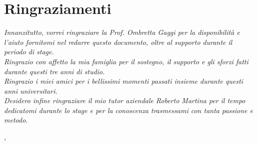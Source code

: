 \cleardoublepage
{}
{}

\bigskip

\begingroup
\let\clearpage\relax
\let\cleardoublepage\relax
\let\cleardoublepage\relax

\chapter*{Ringraziamenti}

\noindent \textit{Innanzitutto, vorrei ringraziare la Prof. Ombretta Gaggi per la disponibilità e l'aiuto fornitomi nel redarre questo documento, oltre al supporto durante il periodo di stage.}\\

\noindent \textit{Ringrazio con affetto la mia famiglia per il sostegno, il supporto e gli sforzi fatti durante questi tre anni di studio.}\\

\noindent \textit{Ringrazio i miei amici per i bellissimi momenti passati insieme durante questi anni universitari.}\\

\noindent \textit{Desidero infine ringraziare il mio tutor aziendale Roberto Martina per il tempo dedicatomi durante lo stage e per la conoscenza trasmessami con tanta passione e metodo.}\\

\bigskip

\noindent\textit{\myLocation, \myTime}
\hfill \myName

\endgroup
